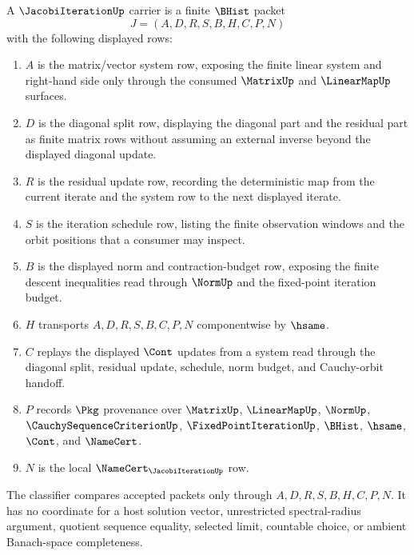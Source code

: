 \begin{definition}
\label{def:jacobi-iteration-carrier}
A $\JacobiIterationUp$ carrier is a finite $\BHist$ packet
$$
J=(A,D,R,S,B,H,C,P,N)
$$
with the following displayed rows:
\begin{enumerate}
\item $A$ is the matrix/vector system row, exposing the finite linear system and right-hand side only through the consumed $\MatrixUp$ and $\LinearMapUp$ surfaces.
\item $D$ is the diagonal split row, displaying the diagonal part and the residual part as finite matrix rows without assuming an external inverse beyond the displayed diagonal update.
\item $R$ is the residual update row, recording the deterministic map from the current iterate and the system row to the next displayed iterate.
\item $S$ is the iteration schedule row, listing the finite observation windows and the orbit positions that a consumer may inspect.
\item $B$ is the displayed norm and contraction-budget row, exposing the finite descent inequalities read through $\NormUp$ and the fixed-point iteration budget.
\item $H$ transports $A,D,R,S,B,C,P,N$ componentwise by $\hsame$.
\item $C$ replays the displayed $\Cont$ updates from a system read through the diagonal split, residual update, schedule, norm budget, and Cauchy-orbit handoff.
\item $P$ records $\Pkg$ provenance over $\MatrixUp$, $\LinearMapUp$, $\NormUp$, $\CauchySequenceCriterionUp$, $\FixedPointIterationUp$, $\BHist$, $\hsame$, $\Cont$, and $\NameCert$.
\item $N$ is the local $\NameCert_{\JacobiIterationUp}$ row.
\end{enumerate}
The classifier compares accepted packets only through $A,D,R,S,B,H,C,P,N$. It has no coordinate for a host solution vector, unrestricted spectral-radius argument, quotient sequence equality, selected limit, countable choice, or ambient Banach-space completeness.
\end{definition}

